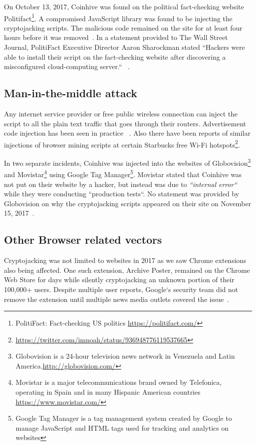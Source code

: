 On October 13, 2017, Coinhive was found on the political fact-checking website Politifact\footnote{PolitiFact: Fact-checking US politics \url{https://politifact.com/}}. A compromised JavaScript library was found to be injecting the cryptojacking scripts. The malicious code remained on the site for at least four hours before it was removed~\cite{politifactcoinhive}. In a statement provided to The Wall Street Journal, PolitiFact Executive Director Aaron Sharockman stated ``Hackers were able to install their script on the fact-checking website after discovering a misconfigured cloud-computing server.`` ~\cite{politifactcoinhivewsj}.

\subsection{Man-in-the-middle attack} 

Any internet service provider or free public wireless connection can inject the script to all the plain text traffic that goes through their routers. Advertisement code injection has been seen in practice ~\cite{vergeadinjection}. Also there have been reports of similar injections of browser mining scripts at certain Starbucks free Wi-Fi hotspots\footnote{\url{https://twitter.com/imnoah/status/936948776119537665}}.

In two separate incidents, Coinhive was injected into the websites of Globovision\footnote{Globovision is a 24-hour television news network in Venezuela and Latin America.\url{http://globovision.com/}} and Movistar\footnote{Movistar is a major telecommunications brand owned by Telefonica, operating in Spain and in many Hispanic American countries \url{https://www.movistar.com/}} using Google Tag Manager\footnote{Google Tag Manager is a tag management system created by Google to manage JavaScript and HTML tags used for tracking and analytics on websites}. Movistar stated that Coinhive was not put on their website by a hacker, but instead was due to \textit{``internal error``} while they were conducting ``production tests``. No statement was provided by Globovision on why the cryptojacking scripts appeared on their site on November 15, 2017~\cite{googletagcoinhive}.

\subsection{Other Browser related vectors} %
Cryptojacking was not limited to websites in 2017 as we saw Chrome extensions also being affected. One such extension, Archive Poster, remained on the Chrome Web Store for days while silently cryptojacking an unknown portion of their 100,000+ users. Despite multiple user reports, Google`s security team did not remove the extension until multiple news media outlets covered the issue~\cite{chromeextentioncoinhive}. 

